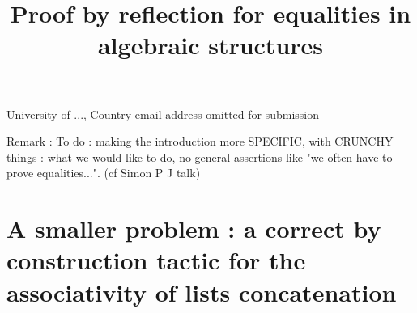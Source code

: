 \documentclass{sigplanconf}
\begin{document}
\setlength{\pdfpageheight}{\paperheight}
\setlength{\pdfpagewidth}{\paperwidth}









\title{Proof by reflection for equalities in algebraic structures}

           {University of ..., Country}
           {email address omitted for submission}



\maketitle

\nocite{*}







Remark : To do : making the introduction more SPECIFIC, with CRUNCHY things : what we would like to do, no general assertions like "we often have to prove equalities...". (cf Simon P J talk)



         
\section {A smaller problem : a correct by construction tactic for the associativity of lists concatenation}
\end{document}

